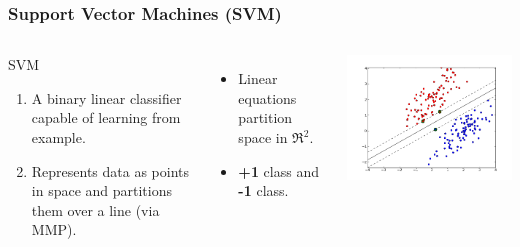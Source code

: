 \documentclass{beamer}
\begin{document}
\begin{frame}
\frametitle{Support Vector Machines (SVM)}
\begin{columns}[c] %


\begin{block}{SVM}
\begin{enumerate}
\item A binary linear classifier capable of learning from example.
\item Represents data as points in space and partitions them over a line (via MMP).
\end{enumerate}
\end{block}

\begin{itemize}
\item Linear equations partition space in $\Re^2$.
\item \textbf{+1} class and \textbf{-1} class.
\end{itemize}


\includegraphics[scale=.5]{../figures/svm-linear.png}

\end{columns}
\end{frame}

\end{document}
